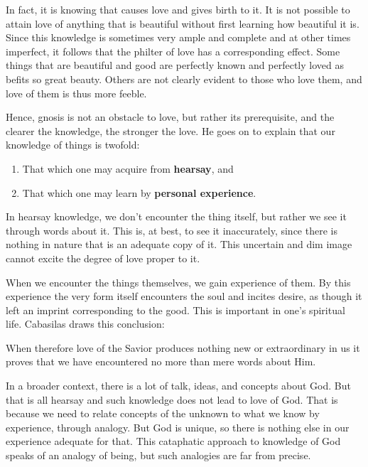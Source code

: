 \begin{quotex}
In fact, it is knowing that causes love and gives birth to it. It is not possible to attain love of anything that is beautiful without first learning how beautiful it is. Since this knowledge is sometimes very ample and complete and at other times imperfect, it follows that the philter of love has a corresponding effect. Some things that are beautiful and good are perfectly known and perfectly loved as befits so great beauty. Others are not clearly evident to those who love them, and love of them is thus more feeble.
\end{quotex}


Hence, gnosis is not an obstacle to love, but rather its prerequisite, and the clearer the knowledge, the stronger the love. He goes on to explain that our knowledge of things is twofold:

\begin{enumerate}


\item That which one may acquire from \textbf{hearsay}, and

\item That which one may learn by \textbf{personal experience}.
\end{enumerate}


In hearsay knowledge, we don't encounter the thing itself, but rather we see it through words about it. This is, at best, to see it inaccurately, since there is nothing in nature that is an adequate copy of it. This uncertain and dim image cannot excite the degree of love proper to it.

When we encounter the things themselves, we gain experience of them. By this experience the very form itself encounters the soul and incites desire, as though it left an imprint corresponding to the good. This is important in one's spiritual life. Cabasilas draws this conclusion:

\begin{quotex}
When therefore love of the Savior produces nothing new or extraordinary in us it proves that we have encountered no more than mere words about Him.
\end{quotex}


In a broader context, there is a lot of talk, ideas, and concepts about God. But that is all hearsay and such knowledge does not lead to love of God. That is because we need to relate concepts of the unknown to what we know by experience, through analogy. But God is unique, so there is nothing else in our experience adequate for that. This cataphatic approach to knowledge of God speaks of an analogy of being, but such analogies are far from precise.


